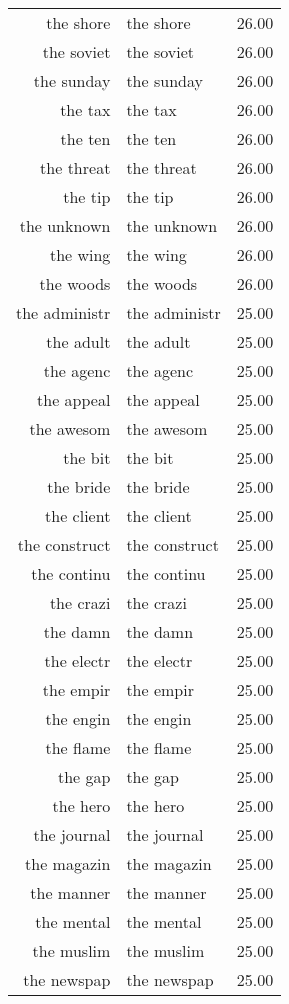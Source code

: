 \begin{table}[ht]
\begin{tabular}{rlr}
  the shore & the shore & 26.00 \\ 
  the soviet & the soviet & 26.00 \\ 
  the sunday & the sunday & 26.00 \\ 
  the tax & the tax & 26.00 \\ 
  the ten & the ten & 26.00 \\ 
  the threat & the threat & 26.00 \\ 
  the tip & the tip & 26.00 \\ 
  the unknown & the unknown & 26.00 \\ 
  the wing & the wing & 26.00 \\ 
  the woods & the woods & 26.00 \\ 
  the administr & the administr & 25.00 \\ 
  the adult & the adult & 25.00 \\ 
  the agenc & the agenc & 25.00 \\ 
  the appeal & the appeal & 25.00 \\ 
  the awesom & the awesom & 25.00 \\ 
  the bit & the bit & 25.00 \\ 
  the bride & the bride & 25.00 \\ 
  the client & the client & 25.00 \\ 
  the construct & the construct & 25.00 \\ 
  the continu & the continu & 25.00 \\ 
  the crazi & the crazi & 25.00 \\ 
  the damn & the damn & 25.00 \\ 
  the electr & the electr & 25.00 \\ 
  the empir & the empir & 25.00 \\ 
  the engin & the engin & 25.00 \\ 
  the flame & the flame & 25.00 \\ 
  the gap & the gap & 25.00 \\ 
  the hero & the hero & 25.00 \\ 
  the journal & the journal & 25.00 \\ 
  the magazin & the magazin & 25.00 \\ 
  the manner & the manner & 25.00 \\ 
  the mental & the mental & 25.00 \\ 
  the muslim & the muslim & 25.00 \\ 
  the newspap & the newspap & 25.00 \\ 

\end{tabular}
\end{table}

